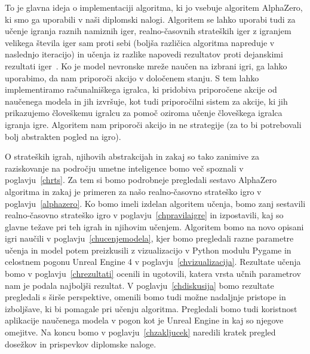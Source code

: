 \documentclass[a4paper, 12pt]{book}
\begin{document}
To je glavna ideja o implementaciji algoritma, ki jo vsebuje algoritem AlphaZero, ki smo ga uporabili v naši diplomski nalogi.
Algoritem se lahko uporabi tudi za učenje igranja raznih namiznih iger, realno-časovnih strateških iger z igranjem velikega števila iger sam proti sebi (boljša različica algoritma napreduje v naslednjo iteracijo) in učenja iz razlike napovedi rezultatov proti dejanskimi rezultati iger~\hl{{\cite{silver2018general}}}.
Ko je model nevronske mreže naučen na izbrani igri, ga lahko uporabimo, da nam priporoči akcijo v določenem stanju.
S tem lahko implementiramo računalniškega igralca, ki pridobiva priporočene akcije od naučenega modela in jih izvršuje, kot tudi priporočilni sistem za akcije, ki jih prikazujemo človeškemu igralcu za pomoč oziroma učenje človeškega igralca igranja igre. 
Algoritem nam priporoči akcijo in ne strategije (za to bi potrebovali bolj abstrakten pogled na igro). 

O strateških igrah, njihovih abstrakcijah in zakaj so tako zanimive za raziskovanje na področju umetne inteligence bomo več spoznali v poglavju~\ref{chrts}.
Za tem si bomo podrobneje pregledali sestavo AlphaZero algoritma in zakaj je primeren za našo realno-časovno strateško igro v poglavju~\ref{alphazero}.
Ko bomo imeli izdelan algoritem učenja, bomo zanj sestavili realno-časovno strateško igro v poglavju~\ref{chpravilaigre} in izpostavili, kaj so glavne težave pri teh igrah in njihovim učenjem.
Algoritem bomo na novo opisani igri naučili v poglavju~\ref{chucenjemodela}, kjer bomo pregledali razne parametre učenja in model potem preizkusili z vizualizacijo v Python modulu Pygame in celostnem pogonu Unreal Engine 4 v poglavju~\ref{chvizualizacija}.
Rezultate učenja bomo v poglavju~\ref{chrezultati} ocenili in ugotovili, katera vrsta učnih parametrov nam je podala najboljši rezultat.
V poglavju~\ref{chdiskusija} bomo rezultate pregledali s širše perspektive, omenili bomo tudi možne nadaljnje pristope in izboljšave, ki bi pomagale pri učenju algoritma. 
Pregledali bomo tudi koristnost aplikacije naučenega modela v pogon kot je Unreal Engine in kaj so njegove omejitve.
Na koncu bomo v poglavju~\ref{chzakljucek} naredili kratek pregled dosežkov in prispevkov diplomske naloge.

\end{document}
